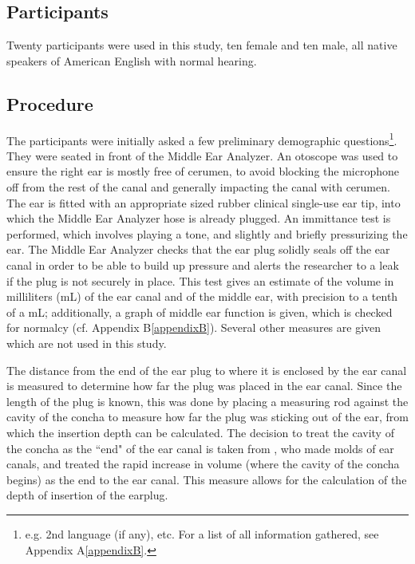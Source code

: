 \documentclass[dissertation,copyright]{uathesis}
\begin{document}
\subsection{Participants}
Twenty participants were used in this study, ten female and ten male, all native speakers of American English with normal hearing.

\subsection{Procedure}

The participants were initially asked a few preliminary demographic questions\footnote{e.g. 2nd language (if any), etc. For a list of all information gathered, see Appendix A\ref{appendixB}.}. They were seated in front of the Middle Ear Analyzer.  An otoscope was used to ensure the right ear is mostly free of cerumen, to avoid blocking the microphone off from the rest of the canal and generally impacting the canal with cerumen.  The ear is fitted with an appropriate sized rubber clinical single-use ear tip, into which the Middle Ear Analyzer hose is already plugged.  An immittance test is performed, which involves playing a tone, and slightly and briefly pressurizing the ear.  The Middle Ear Analyzer checks that the ear plug solidly seals off the ear canal in order to be able to build up pressure and alerts the researcher to a leak if the plug is not securely in place.  This test gives an estimate of the volume in milliliters (mL) of the ear canal and of the middle ear, with precision to a tenth of a mL; additionally, a graph of middle ear function is given, which is checked for normalcy (cf. Appendix B\ref{appendixB}).  Several other measures are given which are not used in this study.

The distance from the end of the ear plug to where it is enclosed by the ear canal is measured to determine how far the plug was placed in the ear canal. %
Since the length of the plug is known, this was done by placing a measuring rod against the cavity of the concha to measure how far the plug was sticking out of the ear, from which the insertion depth can be calculated. The decision to treat the cavity of the concha as the ``end" of the ear canal is taken from \cite{stenfelt:07}, who made molds of ear canals, and treated the rapid increase in volume (where the cavity of the concha begins) as the end to the ear canal.  This measure allows for the calculation of the depth of insertion of the earplug.
\end{document}

